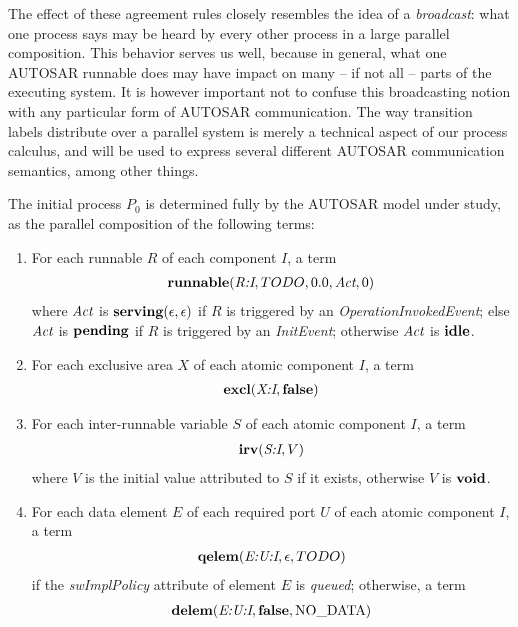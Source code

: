 \documentclass[twocolumn]{article}
\begin{document}
The effect of these agreement rules closely resembles the idea of a \emph{broadcast}: what one process says may be heard by every other process in a large parallel composition. This behavior serves us well, because in general, what one AUTOSAR runnable does may have impact on many -- if not all -- parts of the executing system. It is however important not to confuse this broadcasting notion with any particular form of AUTOSAR communication. The way transition labels distribute over a parallel system is merely a technical aspect of our process calculus, and will be used to express several different AUTOSAR communication semantics, among other things.

The initial process $P_0$ is determined fully by the AUTOSAR model under study, as the parallel composition of the following terms:
\begin{enumerate}

\item For each runnable $R$ of each component $I$, a term
$$
\begin{array}{c}
	\textbf{runnable}(\emph{R:I},TODO,0.0,\text{\it Act},0)
\end{array}
$$
where $\text{\it Act}$ is $\textbf{serving}(\epsilon,\epsilon)$ if $R$ is triggered by an \emph{OperationInvokedEvent}; else $\text{\it Act}$ is $\textbf{pending}$ if $R$ is triggered by an \emph{InitEvent}; otherwise $\text{\it Act}$ is $\textbf{idle}$.

\item For each exclusive area $X$ of each atomic component $I$, a term
$$
\begin{array}{c}
	\textbf{excl}(\emph{X:I},\textbf{false})
\end{array}
$$

\item For each inter-runnable variable $S$ of each atomic component $I$, a term
$$
\begin{array}{c}
	\textbf{irv}(\emph{S:I},V)
\end{array}
$$
where $V$ is the initial value attributed to $S$ if it exists, otherwise $V$ is $\textbf{void}$.

\item For each data element $E$ of each required port $U$ of each atomic component $I$, a term
$$
\begin{array}{c}
	\textbf{qelem}(\emph{E:U:I},\epsilon,TODO)
\end{array}
$$
if the \emph{swImplPolicy} attribute of element $E$ is \emph{queued}; otherwise, a term
$$
\begin{array}{c}
	\textbf{delem}(\emph{E:U:I},\textbf{false},\text{NO\_DATA})
\end{array}
$$


\end{enumerate}
\end{document}
